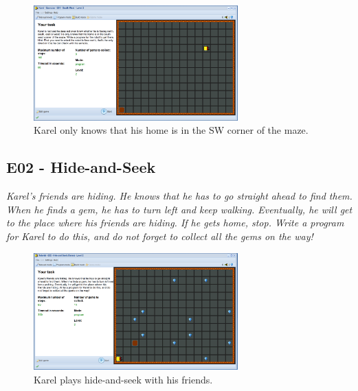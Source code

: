 \documentclass[article,A4,12pt]{llncs}
\begin{document}
\newpage

\begin{figure}[!ht]
\begin{center}
\includegraphics[width=0.7\textwidth]{img/e01.png}
\end{center}
\vspace{-4mm}
\caption{Karel only knows that his home is in the SW corner of the maze.}
\label{fig:e01}
\vspace{-12mm}
\end{figure}
\noindent


\subsection{E02 - Hide-and-Seek}

{\em Karel's friends are hiding. He knows that he has to go straight 
ahead to find them. When he finds a gem, he has to turn left and keep 
walking. Eventually, he will get to the place where his friends are 
hiding. If he gets home, stop. Write a program for Karel to do this, 
and do not forget to collect all the gems on the way!}\\[-7mm]

\begin{figure}[!ht]
\begin{center}
\includegraphics[width=0.7\textwidth]{img/e02.png}
\end{center}
\vspace{-4mm}
\caption{Karel plays hide-and-seek with his friends.}
\label{fig:e02}
\vspace{-10mm}
\end{figure}
\noindent
\newpage
\end{document}
